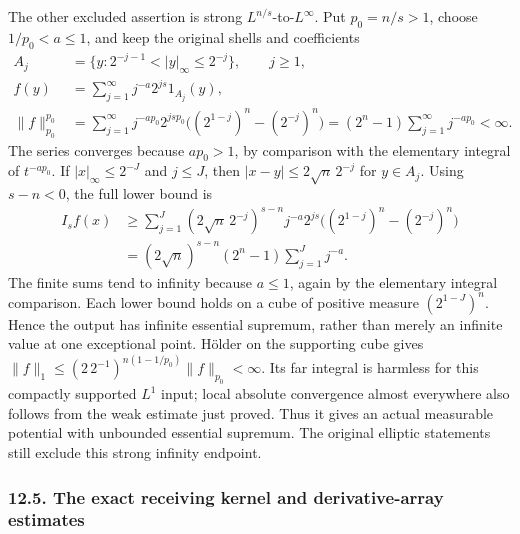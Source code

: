 \documentclass[
  11pt,
]{article}
\makeatletter
\let\ReaderOriginalAnchorStart\hyper@anchorstart
\let\ReaderOriginalAnchorEnd\hyper@anchorend
\let\ReaderPendingAliases\@empty
\def\ReaderArmAliases#1{\gdef\ReaderPendingAliases{#1}}
\def\hyper@anchorstart#1{\ReaderIfNativeAnchorTF{#1}{\ReaderPendingAliases\global\let\ReaderPendingAliases\@empty}{}\ReaderOriginalAnchorStart{#1}}
\makeatother
\begin{document}
The other excluded assertion is strong \(L^{n/s}\)-to-\(L^\infty\). Put
\(p_0=n/s>1\), choose \(1/p_0<a\leq1\), and keep the original shells and
coefficients \[
 \begin{split}
 A_j&=\{y:2^{-j-1}<|y|_\infty\leq2^{-j}\},\qquad j\geq1,\\
 f(y)&=\sum_{j=1}^\infty j^{-a}2^{js}1_{A_j}(y),\\
 \|f\|_{p_0}^{p_0}
 &=\sum_{j=1}^\infty j^{-ap_0}2^{jsp_0}
             \bigl((2^{1-j})^n-(2^{-j})^n\bigr)
   =(2^n-1)\sum_{j=1}^\infty j^{-ap_0}<\infty .
 \end{split}                                                   \tag{FI14}
\] The series converges because \(ap_0>1\), by comparison with the
elementary integral of \(t^{-ap_0}\). If \(|x|_\infty\leq2^{-J}\) and
\(j\leq J\), then \(|x-y|\leq2\sqrt n\,2^{-j}\) for \(y\in A_j\). Using
\(s-n<0\), the full lower bound is \[
 \begin{split}
 I_sf(x)
 &\geq\sum_{j=1}^J
      (2\sqrt n\,2^{-j})^{s-n}j^{-a}2^{js}
          \bigl((2^{1-j})^n-(2^{-j})^n\bigr)\\
 &=(2\sqrt n)^{s-n}(2^n-1)\sum_{j=1}^Jj^{-a}.
 \end{split}                                                   \tag{FI15}
\] The finite sums tend to infinity because \(a\leq1\), again by the
elementary integral comparison. Each lower bound holds on a cube of
positive measure \((2^{1-J})^n\). Hence the output has infinite
essential supremum, rather than merely an infinite value at one
exceptional point. Hölder on the supporting cube gives
\(\|f\|_1\leq(2\,2^{-1})^{n(1-1/p_0)}\|f\|_{p_0}<\infty\). Its far
integral is harmless for this compactly supported \(L^1\) input; local
absolute convergence almost everywhere also follows from the weak
estimate just proved. Thus it gives an actual measurable potential with
unbounded essential supremum. The original elliptic statements still
exclude this strong infinity endpoint.

\ReaderArmAliases{\ReaderOriginalAnchorStart{AN03-LCE-FRAC-005}\ReaderOriginalAnchorEnd\begingroup\expandafter\def\csname @currentHref\endcsname{AN03-LCE-FRAC-005}\label{AN03-LCE-FRAC-005}\endgroup\ReaderOriginalAnchorStart{the-exact-receiving-kernel-and-derivative-array-estimates}\ReaderOriginalAnchorEnd}
\subsubsection{12.5. The exact receiving kernel and derivative-array
estimates}\label{the-exact-receiving-kernel-and-derivative-array-estimates}
\end{document}
